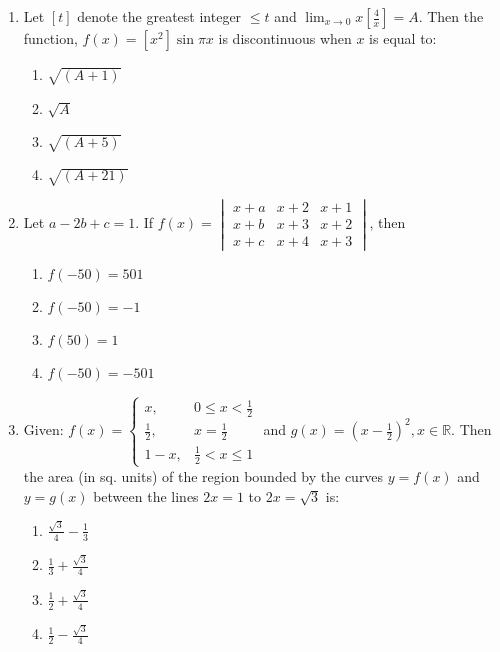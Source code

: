 \documentclass[journal]{IEEEtran}
\begin{document}
\begin{enumerate}
    \item Let $ [t] $ denote the greatest integer $ \leq t $ and
    $ \lim_{x \rightarrow 0} x \left[ \frac{4}{x} \right] = A $.
    Then the function, $ f(x) = [x^{2}] \sin \pi x $ is discontinuous when $ x $ is equal to:
    \begin{enumerate}
        \item $ \sqrt{(A+1)} $
        \item $ \sqrt{A} $
        \item $ \sqrt{(A+5)} $
        \item $ \sqrt{(A+21)} $
    \end{enumerate}

    \item Let $ a - 2b + c = 1 $.
    If $ f(x) = 
    \begin{vmatrix}
    x + a & x + 2 & x + 1 \\
    x + b & x + 3 & x + 2 \\
    x + c & x + 4 & x + 3
    \end{vmatrix} $,
    then
    \begin{enumerate}
        \item $ f(-50) = 501 $
        \item $ f(-50) = -1 $
        \item $ f(50) = 1 $
        \item $ f(-50) = -501 $
    \end{enumerate}

    \item Given:
    $ f(x) = 
    \begin{cases}
    x, & 0 \leq x < \frac{1}{2} \\
    \frac{1}{2}, & x = \frac{1}{2} \\
    1 - x, & \frac{1}{2} < x \leq 1
    \end{cases} $
    and $ g(x) = \left( x - \frac{1}{2} \right)^{2}, x \in \mathbb{R} $.
    Then the area (in sq. units) of the region bounded by the curves $ y = f(x) $ and $ y = g(x) $ between the lines $ 2x = 1 $ to $ 2x = \sqrt{3} $ is:
    \begin{enumerate}
        \item $ \frac{\sqrt{3}}{4} - \frac{1}{3} $
        \item $ \frac{1}{3} + \frac{\sqrt{3}}{4} $
        \item $ \frac{1}{2} + \frac{\sqrt{3}}{4} $
        \item $ \frac{1}{2} - \frac{\sqrt{3}}{4} $
    \end{enumerate}


\end{enumerate}
\end{document}
